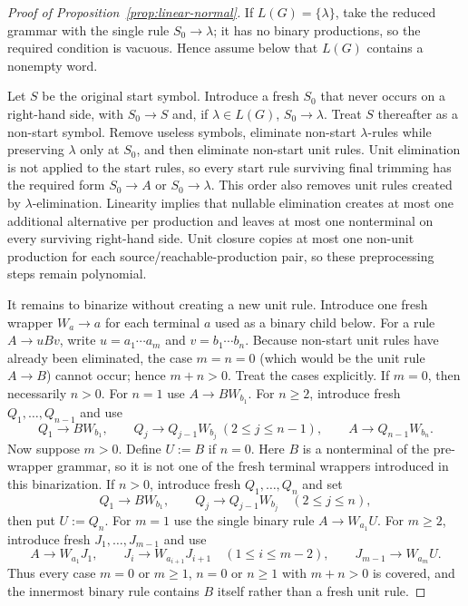 \documentclass[11pt,a4paper]{article}
\theoremstyle{remark}
\theoremstyle{plain}
\begin{document}
\begin{proof}[Proof of Proposition~\ref{prop:linear-normal}]
If $L(G)=\{\lambda\}$, take the reduced grammar with the single rule
$S_0\to\lambda$; it has no binary productions, so the required condition is
vacuous.  Hence assume below that $L(G)$ contains a nonempty word.

Let $S$ be the original start symbol.  Introduce a fresh $S_0$ that never
occurs on a right-hand side, with $S_0\to S$ and, if $\lambda\in L(G)$,
$S_0\to\lambda$.  Treat $S$ thereafter as a non-start symbol.  Remove useless
symbols, eliminate non-start $\lambda$-rules while preserving $\lambda$ only
at $S_0$, and then eliminate non-start unit rules.  Unit elimination is not
applied to the start rules, so every start rule surviving final trimming has
the required form $S_0\to A$ or $S_0\to\lambda$.  This order also removes unit rules created by $\lambda$-elimination.
Linearity implies that nullable elimination creates at most one additional
alternative per production and leaves at most one nonterminal on every
surviving right-hand side.  Unit closure copies at most one non-unit
production for each source/reachable-production pair, so these preprocessing
steps remain polynomial.

It remains to binarize without creating a new unit rule.  Introduce one fresh
wrapper $W_a\to a$ for each terminal $a$ used as a binary child below.
For a rule $A\to uBv$, write $u=a_1\cdots a_m$ and
$v=b_1\cdots b_n$.  Because non-start unit rules have already been
eliminated, the case $m=n=0$ (which would be the unit rule $A\to B$) cannot
occur; hence $m+n>0$.  Treat the cases explicitly.  If $m=0$, then necessarily
$n>0$.  For $n=1$ use $A\to BW_{b_1}$.
For $n\ge2$, introduce fresh $Q_1,\ldots,Q_{n-1}$ and use
\[
 Q_1\to BW_{b_1},\qquad
 Q_j\to Q_{j-1}W_{b_j}\ (2\le j\le n-1),\qquad
 A\to Q_{n-1}W_{b_n}.
\]
Now suppose $m>0$.  Define $U:=B$ if $n=0$.  Here $B$ is a
nonterminal of the pre-wrapper grammar, so it is not one of the fresh
terminal wrappers introduced in this binarization.  If $n>0$, introduce fresh
$Q_1,\ldots,Q_n$ and set
\[
 Q_1\to BW_{b_1},\qquad
 Q_j\to Q_{j-1}W_{b_j}\quad(2\le j\le n),
\]
then put $U:=Q_n$.  For $m=1$ use the single binary rule $A\to W_{a_1}U$.
For $m\ge2$, introduce fresh $J_1,\ldots,J_{m-1}$ and use
\[
 A\to W_{a_1}J_1,\qquad
 J_i\to W_{a_{i+1}}J_{i+1}\quad(1\le i\le m-2),\qquad
 J_{m-1}\to W_{a_m}U.
\]
Thus every case $m=0$ or $m\ge1$, $n=0$ or $n\ge1$ with $m+n>0$ is covered,
and the innermost binary rule contains $B$ itself rather than a fresh unit
rule.


\end{proof}
\end{document}
